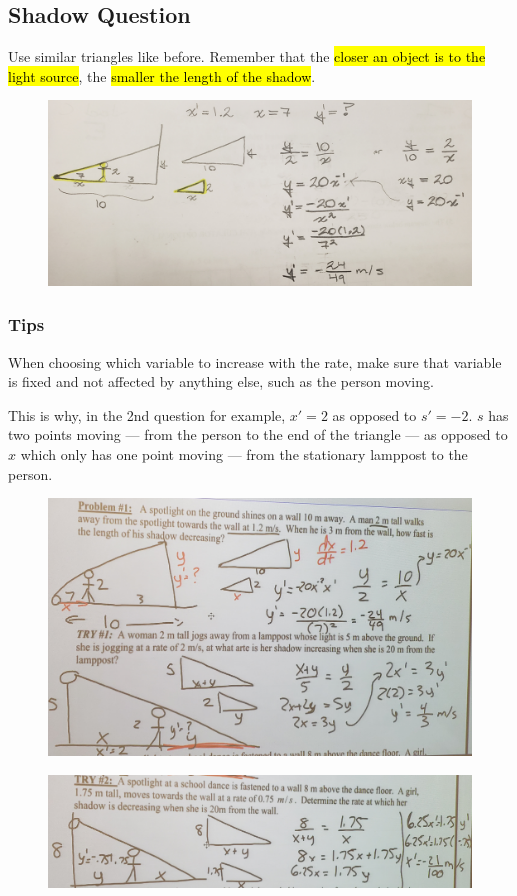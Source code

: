\documentclass[a4paper,12pt]{article}
\begin{document}
\subsection{Shadow Question}
Use similar triangles like before. Remember that the \hl{closer an object is to the light source}, the \hl{smaller the length of the shadow}.
\begin{figure}[H]
    \centering
    \includegraphics[width=\textwidth]{shadow}
\end{figure}

\subsubsection{Tips}
When choosing which variable to increase with the rate, make sure that variable is fixed and not affected by anything else, such as the person moving.

This is why, in the 2nd question for example, $x' = 2$ as opposed to $s' = -2$. $s$ has two points moving --- from the person to the end of the triangle --- as opposed to $x$ which only has one point moving --- from the stationary lamppost to the person.

\begin{figure}[H]
    \centering
    \includegraphics[width=\textwidth]{shadow2}
\end{figure}
\begin{figure}[H]
    \centering
    \includegraphics[width=\textwidth]{shadow3}
\end{figure}
\end{document}

